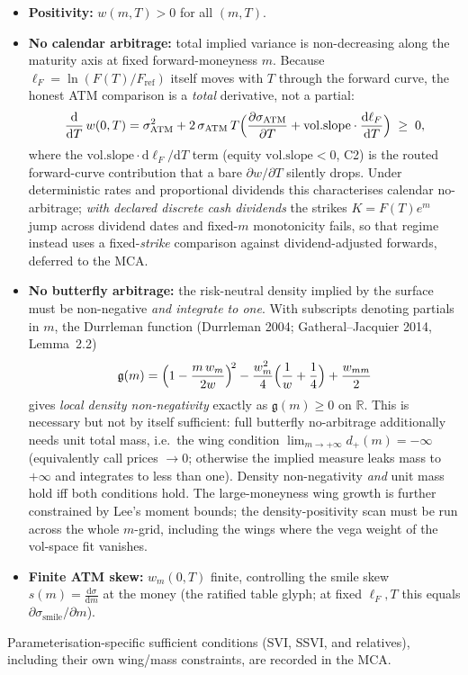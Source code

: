 \documentclass[11pt]{book}
\theoremstyle{plain}
\theoremstyle{definition}
\theoremstyle{remark}
\newcommand{\mln}{m}                             %
\newcommand{\lF}{\ell_F}                         %
\newcommand{\Fref}{F_{\mathrm{ref}}}             %
\newcommand{\ssm}{\sigma_{\mathrm{smile}}}       %
\newcommand{\satm}{\sigma_{\mathrm{ATM}}}        %
\newcommand{\volslope}{\mathrm{vol.slope}}       %
\newcommand{\gDurr}{\mathfrak{g}}                %
\newcommand{\dd}{\mathrm{d}}                                  %
\newcommand{\pd}[2]{\frac{\partial #1}{\partial #2}}          %
\newcommand{\td}[2]{\frac{\dd #1}{\dd #2}}                    %
\begin{document}
\begin{itemize}[nosep]
    \item \textbf{Positivity:} $w(\mln,T)>0$ for all $(\mln,T)$.
    \item \textbf{No calendar arbitrage:} total implied variance is non-decreasing
        along the maturity axis at fixed forward-moneyness $\mln$. Because
        $\lF=\ln(F(T)/\Fref)$ itself moves with $T$ through the forward curve, the
        honest ATM comparison is a \emph{total} derivative, not a partial:
        \[
            \td{}{T}\,w(0,T)
            = \satm^2
              + 2\,\satm\,T\Bigl(\pd{\satm}{T}
                    + \volslope\cdot\td{\lF}{T}\Bigr)\;\ge\;0 ,
        \]
        where the $\volslope\cdot \dd\lF/\dd T$ term (equity $\volslope<0$, C2)
        is the routed forward-curve contribution that a bare $\partial w/\partial
        T$ silently drops. Under deterministic rates and proportional dividends
        this characterises calendar no-arbitrage; \emph{with declared discrete
        cash dividends} the strikes $K=F(T)e^{\mln}$ jump across dividend dates and
        fixed-$\mln$ monotonicity fails, so that regime instead uses a
        fixed-\emph{strike} comparison against dividend-adjusted forwards, deferred
        to the MCA.
    \item \textbf{No butterfly arbitrage:} the risk-neutral density implied by the
        surface must be non-negative \emph{and integrate to one}. With subscripts
        denoting partials in $\mln$, the Durrleman function (Durrleman 2004;
        Gatheral--Jacquier 2014, Lemma~2.2)
        \[
            \gDurr(\mln)
            = \Bigl(1-\frac{\mln\,w_{\mln}}{2w}\Bigr)^{\!2}
            - \frac{w_{\mln}^2}{4}\Bigl(\frac1w+\frac14\Bigr)
            + \frac{w_{\mln\mln}}{2}
        \]
        gives \emph{local density non-negativity} exactly as $\gDurr(\mln)\ge0$ on
        $\mathbb{R}$. This is necessary but not by itself sufficient: full
        butterfly no-arbitrage additionally needs unit total mass, i.e.\ the wing
        condition $\lim_{\mln\to+\infty}d_+(\mln)=-\infty$ (equivalently call
        prices $\to0$; otherwise the implied measure leaks mass to $+\infty$ and
        integrates to less than one). Density non-negativity \emph{and} unit mass
        hold iff both conditions hold. The large-moneyness wing growth is further
        constrained by Lee's moment bounds; the density-positivity scan must be run
        across the whole $\mln$-grid, including the wings where the vega weight of
        the vol-space fit vanishes.
    \item \textbf{Finite ATM skew:} $w_{\mln}(0,T)$ finite, controlling the smile
        skew $s(\mln)=\td{\sigma}{\mln}$ at the money (the ratified table glyph;
        at fixed $\lF,T$ this equals $\partial\ssm/\partial\mln$).
\end{itemize}
Parameterisation-specific sufficient conditions (SVI, SSVI, and relatives),
including their own wing/mass constraints, are recorded in the MCA.
\end{document}
